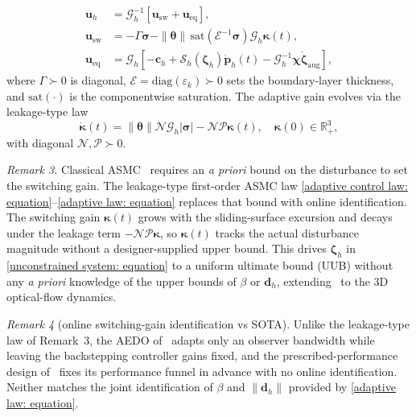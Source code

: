 \documentclass{IEEEtaes}
\begin{document}
\begin{align} \label{adaptive control law: equation}
    \boldsymbol{u}_h &= \mathcal{G}_h^{-1}[\boldsymbol{u}_\text{sw}+\boldsymbol{u}_\text{eq}],\nonumber\\
    \boldsymbol{u}_\text{sw} &= -\Gamma\boldsymbol{\sigma} - \|\boldsymbol{\theta}\|\,\text{sat}(\mathcal{E}^{-1}\boldsymbol{\sigma})\mathcal{G}_h\boldsymbol{\kappa}(t),\\
    \boldsymbol{u}_\text{eq} &= \mathcal{G}_h\!\left[-\boldsymbol{c}_h+\mathcal{S}_h(\boldsymbol{\zeta}_h)\dot{\boldsymbol{p}}_h(t)-\mathcal{G}_h^{-1}\boldsymbol{\chi}\dot{\boldsymbol{\zeta}}_\text{aug}\right],\nonumber
\end{align}
where $\Gamma\succ 0$ is diagonal, $\mathcal{E}=\text{diag}(\varepsilon_k)\succ 0$ sets the boundary-layer thickness, and $\text{sat}(\cdot)$ is the componentwise saturation. The adaptive gain evolves via the leakage-type law
\begin{equation} \label{adaptive law: equation}
    \dot{\boldsymbol{\kappa}}(t) = \|\boldsymbol{\theta}\|\mathcal{N}\mathcal{G}_h|\boldsymbol{\sigma}| - \mathcal{N}\mathcal{P}\boldsymbol{\kappa}(t),\quad\boldsymbol{\kappa}(0)\in\mathbb{R}_+^3,
\end{equation}
with diagonal $\mathcal{N},\mathcal{P}\succ 0$.

\textit{Remark 3.} Classical ASMC~\cite{roy2020} requires an \emph{a priori} bound on the disturbance to set the switching gain. The leakage-type first-order ASMC law \eqref{adaptive control law: equation}--\eqref{adaptive law: equation} replaces that bound with online identification. The switching gain $\boldsymbol{\kappa}(t)$ grows with the sliding-surface excursion and decays under the leakage term $-\mathcal{N}\mathcal{P}\boldsymbol{\kappa}$, so $\boldsymbol{\kappa}(t)$ tracks the actual disturbance magnitude without a designer-supplied upper bound. This drives $\boldsymbol{\zeta}_h$ in \eqref{unconstrained system: equation} to a uniform ultimate bound (UUB) without any \emph{a priori} knowledge of the upper bounds of $\beta$ or $\boldsymbol{d}_h$, extending~\cite{singhal2025} to the 3D optical-flow dynamics.

\textit{Remark 4} (online switching-gain identification vs SOTA). Unlike the leakage-type law of Remark~3, the AEDO of~\cite{zhang2026} adapts only an observer bandwidth while leaving the backstepping controller gains fixed, and the prescribed-performance design of~\cite{lin2023} fixes its performance funnel in advance with no online identification. Neither matches the joint identification of $\beta$ and $\|\boldsymbol{d}_h\|$ provided by \eqref{adaptive law: equation}.
\end{document}
